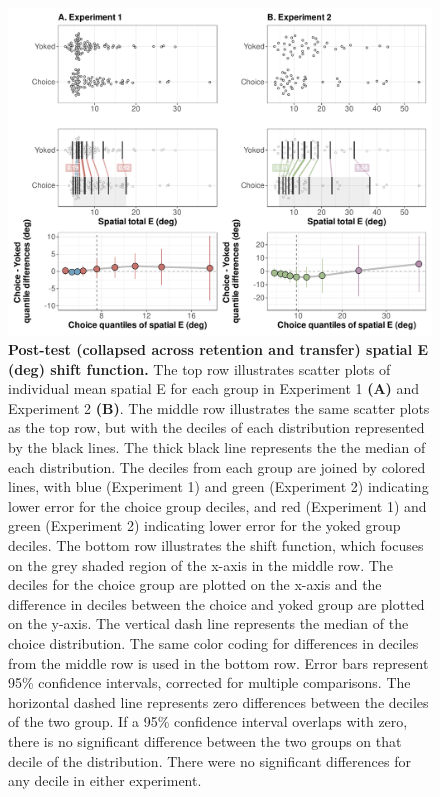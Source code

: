 \documentclass[
  doc, donotrepeattitle,floatsintext]{apa7}
\begin{document}
\begin{figure}

{\centering \includegraphics{../../figs/figS1} 

}

\caption{\small \normalfont \onehalfspacing \textbf{Post-test (collapsed across retention and transfer) spatial E (deg) shift function.} The top row illustrates scatter plots of individual mean spatial E for each group in Experiment 1 \textbf{(A)} and Experiment 2 \textbf{(B)}. The middle row illustrates the same scatter plots as the top row, but with the deciles of each distribution represented by the black lines. The thick black line represents the the median of each distribution. The deciles from each group are joined by colored lines, with blue (Experiment 1) and green (Experiment 2) indicating lower error for the choice group deciles, and red (Experiment 1) and green (Experiment 2) indicating lower error for the yoked group deciles. The bottom row illustrates the shift function, which focuses on the grey shaded region of the x-axis in the middle row. The deciles for the choice group are plotted on the x-axis and the difference in deciles between the choice and yoked group are plotted on the y-axis. The vertical dash line represents the median of the choice distribution. The same color coding for differences in deciles from the middle row is used in the bottom row. Error bars represent 95\% confidence intervals, corrected for multiple comparisons. The horizontal dashed line represents zero differences between the deciles of the two group. If a 95\% confidence interval overlaps with zero, there is no significant difference between the two groups on that decile of the distribution. There were no significant differences for any decile in either experiment.}\label{fig:figS1}
\end{figure}
\end{document}
